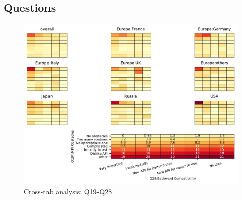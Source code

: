 
\subsection{Questions}


\begin{figure}
\begin{center}
\includegraphics[width=12cm]{../pdfs/Q19-Q28.pdf}
\caption{Cross-tab analysis: Q19-Q28}
\label{fig:Q19-Q28}
\end{center}
\end{figure}

